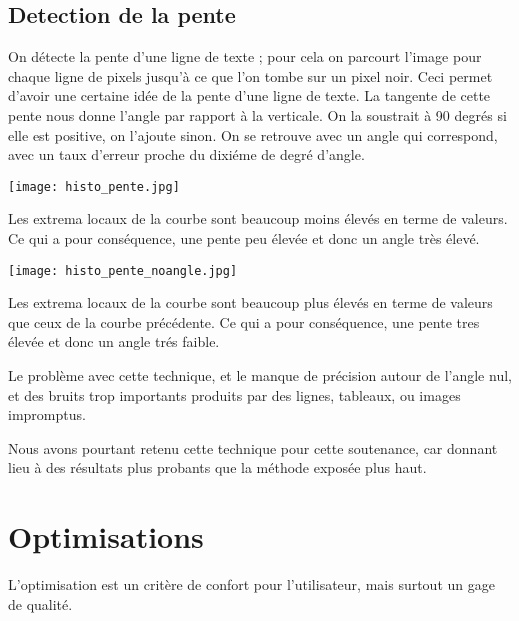 \documentclass[a4paper,10pt]{report}
\begin{document}
\subsection{ Detection de la pente }
On d\'etecte la pente d'une ligne de texte ; pour cela on parcourt
l'image pour chaque ligne de pixels jusqu'\`a ce que l'on tombe sur un
pixel noir. Ceci permet d'avoir une certaine id\'ee de la pente d'une ligne
de texte. La tangente de cette pente nous donne l'angle par rapport \`a
la verticale. On la soustrait \`a 90 degr\'es si elle est positive, on
l'ajoute sinon. On se retrouve avec un angle qui correspond, avec un
taux d'erreur proche du dixi\'eme de degr\'e d'angle.


\begin{center}
	
	\texttt{[image: histo\_pente.jpg]}\\
\end{center}

Les extrema locaux de la courbe sont beaucoup moins \'elev\'es en
terme de valeurs. Ce qui a pour cons\'equence, une pente peu \'elev\'ee et donc un angle tr\`es \'elev\'e.



\begin{center}
	
	\texttt{[image: histo\_pente\_noangle.jpg]}\\
\end{center}

Les extrema locaux de la courbe sont beaucoup plus \'elev\'es en
terme de valeurs que ceux de la courbe pr\'ec\'edente. Ce qui a pour
cons\'equence, une pente tres \'elev\'ee et donc un angle tr\'es faible.

Le probl\`eme avec cette technique, et le manque de pr\'ecision autour
de l'angle nul, et des bruits trop importants produits par des lignes,
tableaux, ou images impromptus.

Nous avons pourtant retenu cette technique pour cette soutenance, car
donnant lieu \`a des r\'esultats plus probants que la m\'ethode expos\'ee
plus haut.

\section{ Optimisations  }
 L'optimisation est un crit\`ere de confort pour l'utilisateur, mais
 surtout un gage de qualit\'e.
\end{document}
